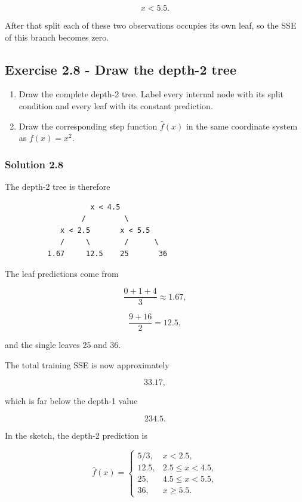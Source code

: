 \documentclass[10pt]{article}
\begin{document}
\[
x<5.5.
\]

After that split each of these two observations occupies its own leaf,
so the SSE of this branch becomes zero.

\par\endgroup

\subsection*{Exercise 2.8 - Draw the depth-2 tree}
\begin{enumerate}
\item
Draw the complete depth-2 tree. Label every internal node with its split condition and every leaf with its constant prediction.

\item
Draw the corresponding step function $\hat f(x)$ in the same coordinate system as $f(x)=x^2$.

\end{enumerate}
\begingroup\color{red}

\subsubsection*{Solution 2.8}
The depth-2 tree is therefore

\begin{verbatim}
                    x < 4.5
                  /         \
             x < 2.5       x < 5.5
             /     \        /      \
          1.67     12.5    25       36
\end{verbatim}
The leaf predictions come from

\[
\frac{0+1+4}{3}\approx1.67,
\]

\[
\frac{9+16}{2}=12.5,
\]

and the single leaves $25$ and $36$.

The total training SSE is now approximately

\[
33.17,
\]

which is far below the depth-1 value

\[
234.5.
\]

In the sketch, the depth-2 prediction is

\[
\hat f(x)=\begin{cases}
5/3,&x<2.5,\\
12.5,&2.5\leq x<4.5,\\
25,&4.5\leq x<5.5,\\
36,&x\geq5.5.
\end{cases}
\]
\end{document}
